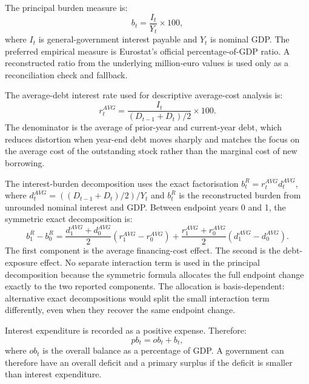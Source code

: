 \documentclass[11pt,a4paper]{article}
\begin{document}
The principal burden measure is:
\begin{equation}
  b_t =
  \frac{I_t}{Y_t}\times 100,
  \label{eq:burden}
\end{equation}
where \(I_t\) is general-government interest payable and \(Y_t\) is nominal
GDP. The preferred empirical measure is Eurostat's official percentage-of-GDP
ratio. A reconstructed ratio from the underlying million-euro values is used
only as a reconciliation check and fallback.

The average-debt interest rate used for descriptive average-cost analysis is:
\begin{equation}
  r_t^{AVG} =
  \frac{I_t}{(D_{t-1}+D_t)/2}\times 100.
  \label{eq:average-debt-rate}
\end{equation}
The denominator is the average of prior-year and current-year debt, which
reduces distortion when year-end debt moves sharply and matches the focus on
the average cost of the outstanding stock rather than the marginal cost of new
borrowing.

The interest-burden decomposition uses the exact factorisation
\(b_t^{R}=r_t^{AVG}d_t^{AVG}\), where
\(d_t^{AVG}=((D_{t-1}+D_t)/2)/Y_t\) and \(b_t^{R}\) is the reconstructed
burden from unrounded nominal interest and GDP. Between endpoint years 0 and
1, the symmetric exact decomposition is:
\begin{equation}
  b_1^{R}-b_0^{R}
  =
  \frac{d_1^{AVG}+d_0^{AVG}}{2}
  \left(r_1^{AVG}-r_0^{AVG}\right)
  +
  \frac{r_1^{AVG}+r_0^{AVG}}{2}
  \left(d_1^{AVG}-d_0^{AVG}\right).
  \label{eq:burden-decomposition}
\end{equation}
The first component is the average financing-cost effect. The second is the
debt-exposure effect. No separate interaction term is used in the principal
decomposition because the symmetric formula allocates the full endpoint change
exactly to the two reported components. The allocation is basis-dependent:
alternative exact decompositions would split the small interaction term
differently, even when they recover the same endpoint change.

Interest expenditure is recorded as a positive expense. Therefore:
\begin{equation}
  pb_t = ob_t + b_t,
  \label{eq:primary-balance}
\end{equation}
where \(ob_t\) is the overall balance as a percentage of GDP. A government can
therefore have an overall deficit and a primary surplus if the deficit is
smaller than interest expenditure.
\end{document}
